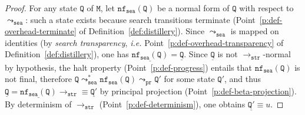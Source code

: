 \documentclass[10pt,a4paper]{article}
\theoremstyle{remark}
\newcommand{\tmtwo}{u}
\newcommand{\Rew}[1]{\rightarrow_{#1}}
\newcommand{\tostrat}{\Rew{\symfont{str}}}
\newcommand{\symfont}[1]{\mathtt{#1}}
\newcommand{\streq}{\equiv}
\newcommand{\ie}{{\em i.e.}\xspace}
\newcommand{\refdef}[1]{Definition~\ref{def:#1}}
\newcommand{\refpoint}[1]{Point~\ref{p:#1}}
\renewcommand{\state}{\symfont{Q}}
\newcommand{\state}{\symfont{Q}}
\newcommand{\statetwo}{\state'}
\newcommand{\decode}[1]{\underline{#1}}
\newcommand{\mach}{\symfont{M}}
\newcommand{\tomachhole}[1]{\leadsto_{#1}}
\newcommand{\seasym}{\symfont{sea}}
\newcommand{\tomachsea}{\tomachhole{\seasym}}
\newcommand{\prsym}{\symfont{pr}}
\newcommand{\tomachpr}{\tomachhole{\prsym}}
\newcommand{\nfo}[1]{\symfont{nf}_{\seasym}(#1)}
\begin{document}
\begin{proof}
  For any state $\state$ of $\mach$, let $\nfo{\state}$ be a normal form of $\state$ with respect to $\tomachsea$: such a state exists because search transitions terminate (\refpoint{def-overhead-terminate} of \refdef{distillery}).
  Since $\tomachsea$ is mapped on identities (by \emph{search transparency}, \ie \refpoint{def-overhead-transparency} of \refdef{distillery}), one has $\decode{\nfo{\state}} = \decode\state$.
  Since $\decode\state$ is not $\tostrat$-normal by hypothesis, the halt property (\refpoint{def-progress}) entails that $\nfo{\state}$ is not final, therefore $\state \tomachsea^* \nfo{\state} \tomachpr \statetwo$ for some state $\statetwo$, and thus $\decode\state = \decode{\nfo{\state}} \tostrat \streq\decode{\statetwo}$ by principal projection (\refpoint{def-beta-projection}).
  By determinism of $\tostrat$ (\refpoint{def-determinism}), one obtains $\decode{\statetwo} \streq \tmtwo$.
\end{proof}
\end{document}
